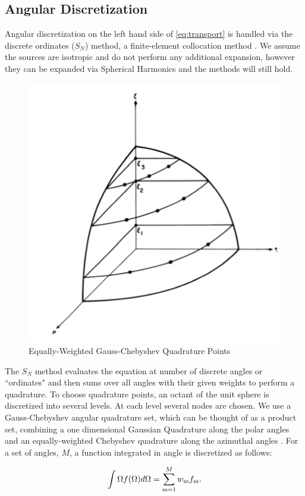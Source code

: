 \subsection{Angular Discretization}

Angular discretization on the left hand side of \eqref{eq:transport} is handled via the discrete ordinates ($S_N$) method, a finite-element collocation method \cite{Lathrop1965}. We assume the sources are isotropic and do not perform any additional expansion, however they can be expanded via Spherical Harmonics and the methods will still hold. 

\begin{figure}[H]
    \centering
    \includegraphics[width=.5\textwidth]{fig/SNPoints.png}
    \caption{Equally-Weighted Gauss-Chebyshev Quadrature Points \cite{Lathrop1965}}
    \label{fig:SN}
\end{figure}

The $S_N$ method evaluates the equation at number of discrete angles or ``ordinates" and then sums over all angles with their given weights to perform a quadrature. To choose quadrature points, an octant of the unit sphere is discretized into several levels. At each level several nodes are chosen. We use a Gauss-Chebyshev angular quadrature set, which can be thought of as a product set, combining a one dimensional Gaussian Quadrature along the polar angles and an equally-weighted Chebyshev quadrature along the azimuthal angles \cite{jarrel-thesis}. For a set of angles, $M$, a function integrated in angle is discretized as follows:

\begin{equation}
\int \Omega f(\Omega) d\Omega = \sum\limits_{\mathrm{m}=1}^{M} w_{\mathrm{m}} f_{\mathrm{m}}.    
\end{equation}






